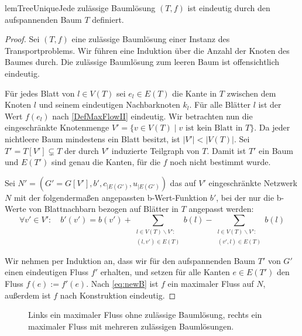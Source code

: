 \vspace{-1.9ex}
\begin{restatable}{lem}{TreeUnique}\label{TreeUnique}Jede zulässige Baumlösung $(T,f)$ ist eindeutig durch den aufspannenden Baum $T$ definiert.\end{restatable}
\begin{proof}Sei $(T,f)$ eine zulässige Baumlösung einer Instanz des Transportproblems. Wir führen eine Induktion über die Anzahl der Knoten des Baumes durch. Die zulässige Baumlösung zum leeren Baum ist offensichtlich eindeutig.

Für jedes Blatt von $l\in V(T)$ sei $e_l\in E(T)$ die Kante in $T$ zwischen dem Knoten $l$ und seinem eindeutigen Nachbarknoten $k_l$. Für alle Blätter $l$ ist der Wert $f(e_l)$ nach \cref{DefMaxFlowII} eindeutig. Wir betrachten nun die eingeschränkte Knotenmenge $V'=\{v\in V(T)\mid v\text{ ist kein Blatt in }T\}$. Da jeder nichtleere Baum mindestens ein Blatt besitzt, ist $|V'|<|V(T)|$. Sei $T'=T[V']\subsetneq T$ der durch $V'$ induzierte Teilgraph von $T$. Damit ist $T'$ ein Baum und $E(T')$ sind genau die Kanten, für die $f$ noch nicht bestimmt wurde.

Sei $N'=(G'=G[V'],b',c_{|E(G')},u_{|E(G')})$ das auf $V'$ eingeschränkte Netzwerk $N$ mit der folgendermaßen angepassten b-Wert-Funktion $b'$, bei der nur die b-Werte von Blattnachbarn bezogen auf Blätter in $T$ angepasst werden:
\begin{equation}\label{eq:newB}
\forall v'\in V'\colon\quad b'(v')=b(v')+\sum_{\substack{l\in V(T)\backslash V':\\(l,v')\in E(T)}} b(l)-\sum_{\substack{l\in V(T)\backslash V':\\(v',l)\in E(T)}} b(l)\end{equation}

Wir nehmen per Induktion an, dass wir für den aufspannenden Baum $T'$ von $G'$ einen eindeutigen Fluss $f'$ erhalten, und setzen für alle Kanten $e\in E(T')$ den Fluss $f(e):=f'(e)$. Nach \cref{eq:newB} ist $f$ ein maximaler Fluss auf $N$, außerdem ist $f$ nach Konstruktion eindeutig.\end{proof}

\begin{figure}[!ht]\centering
    
    \caption{Links ein maximaler Fluss ohne zulässige Baumlösung, rechts ein maximaler Fluss mit mehreren zulässigen Baumlösungen.}
    \label{fig:BL}
\end{figure}

